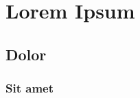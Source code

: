 \chapter{Lorem Ipsum}\label{chap:lipsum}

\lipsum[1]

\section{Dolor}
\lipsum[2-4]

\subsection{Sit amet}
\lipsum[5-12]